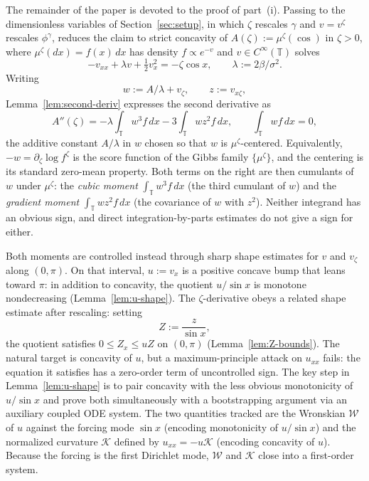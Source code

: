 \documentclass{amsart}
\newcommand{\T}{\mathbb T}
\begin{document}
The remainder of the paper is devoted to the proof of part~(i).
Passing to the dimensionless variables of Section~\ref{sec:setup}, in
which $\zeta$ rescales $\gamma$ and $v=v^\zeta$ rescales $\phi^\gamma$,
reduces the claim to strict concavity of $A(\zeta):=\mu^\zeta(\cos)$ in
$\zeta>0$, where $\mu^\zeta(dx)=f(x)\,dx$ has density $f\propto e^{-v}$
and $v\in C^\infty(\T)$ solves
\[
-v_{xx}+\lambda v+\tfrac12 v_x^2=-\zeta\cos x,
\qquad\lambda:=2\beta/\sigma^2.
\]
Writing
\[
w:=A/\lambda+v_\zeta,\qquad z:=v_{x\zeta},
\]
Lemma~\ref{lem:second-deriv} expresses the second derivative as
\begin{equation}\label{eq:second-derivative-intro}
A''(\zeta)=-\lambda\int_\T w^3 f\,dx
-3\int_\T wz^2 f\,dx,\qquad \int_\T wf\,dx=0,
\end{equation}
the additive constant $A/\lambda$ in $w$ chosen so that $w$ is
$\mu^\zeta$-centered. Equivalently, $-w=\partial_\zeta\log f^\zeta$ is
the score function of the Gibbs family $\{\mu^\zeta\}$, and the
centering is its standard zero-mean property. Both terms on the right
are then cumulants of $w$ under $\mu^\zeta$: the \emph{cubic moment}
$\int_\T w^3 f\,dx$ (the third cumulant of $w$) and the \emph{gradient
moment} $\int_\T wz^2 f\,dx$ (the covariance of $w$ with $z^2$).
Neither integrand has an obvious sign, and direct integration-by-parts
estimates do not give a sign for either.

Both moments are controlled instead through sharp shape estimates for
$v$ and $v_\zeta$ along $(0,\pi)$. On that interval,
$u:=v_x$ is a positive concave bump that leans toward $\pi$:
in addition to concavity, the quotient $u/\sin x$ is monotone
nondecreasing (Lemma~\ref{lem:u-shape}). The $\zeta$-derivative obeys a
related shape estimate after rescaling: setting
\[
Z:=\frac{z}{\sin x},
\]
the quotient satisfies $0\leq Z_x\leq uZ$ on $(0,\pi)$
(Lemma~\ref{lem:Z-bounds}). The natural
target is concavity of $u$, but a maximum-principle attack on $u_{xx}$
fails: the equation it satisfies has a zero-order term of uncontrolled
sign. The key step in Lemma~\ref{lem:u-shape} is to pair
concavity with the less obvious monotonicity of $u/\sin x$ and prove
both simultaneously with a bootstrapping argument via an auxiliary coupled ODE system.
The two quantities tracked are the Wronskian $\mathcal W$ of $u$ against the
forcing mode $\sin x$ (encoding monotonicity of $u/\sin x$) and the
normalized curvature $\mathcal K$ defined by $u_{xx}=-u\mathcal K$ (encoding concavity
of $u$). Because the forcing is the first Dirichlet mode, $\mathcal W$ and
$\mathcal K$ close into a first-order system.
\end{document}
